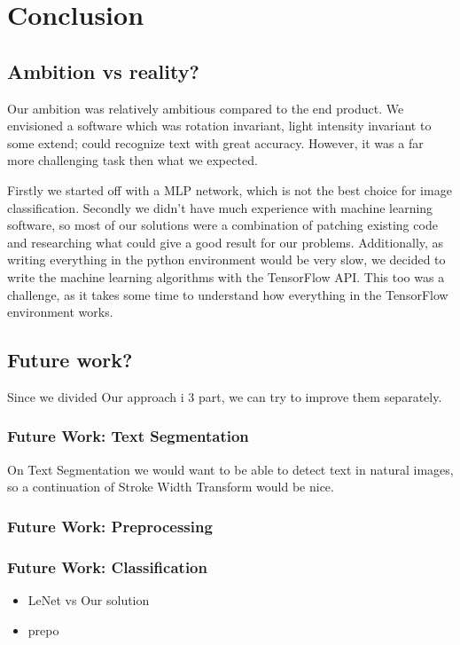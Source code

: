 \documentclass[Report.tex]{subfiles}
\begin{document}
\chapter{Conclusion}
\label{chap:Conclusion}


\section{Ambition vs reality?}
Our ambition was relatively ambitious compared to the end product. We envisioned
a software which was rotation invariant, light intensity invariant to some
extend; could recognize text with great accuracy. However, it was a far more
challenging task then what we expected. \par
Firstly we started off with a MLP network, which is not the best choice for
image classification. Secondly we didn't have much experience with
machine learning software, so most of our solutions were a combination of
patching existing code and researching what could give a good result for
our problems. Additionally, as writing everything in the python environment
would be very slow, we decided to write the machine learning algorithms with the
TensorFlow API. This too was a challenge, as it takes some time to understand
how everything in the TensorFlow environment works.


\section{Future work?}
Since we divided Our approach i 3 part, we can try to improve them separately. 

\subsection{Future Work: Text Segmentation}
On Text Segmentation we would want to be able to detect text in natural images, so a continuation of Stroke Width Transform would be nice. 

\subsection{Future Work: Preprocessing}

\subsection{Future Work: Classification}



\begin{itemize}
  \item LeNet vs Our solution
  \item prepo
\end{itemize}
\end{document}
